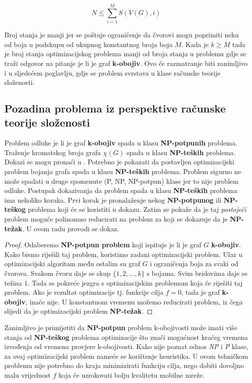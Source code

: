 \documentclass[times, utf8, diplomski, numeric]{fer}
\begin{document}
\begin{equation}
N \le \sum_{i=1}^{M} S(V(G), i)
\end{equation}

Broj stanja je manji jer se poštuje ograničenje da čvorovi mogu poprimiti neku od boja u podskupu od ukupnog konstantnog broja boja $M$. Kada je $k\ge M$ tada je broj stanja optimizacijskog problema manji od broja stanja u problemu gdje se traži odgovor na pitanje je li je graf \textbf{k-obojiv}. Ovo će razmatranje biti zanimljivo i u sljedećem poglavlju, gdje se problem svrstava u klase računske teorije složenosti.

\subsection{Pozadina problema iz perspektive računske teorije složenosti}

Problem odluke je li je graf \textbf{k-obojiv} spada u klasu \textbf{NP-potpunih} problema. Traženje kromatskog broja grafa $\chi(G)$ spada u klasu \textbf{NP-teških} problema. Dokazi se mogu pronaći u \cite{lit16}. Potrebno je pokazati da postavljen optimizacijski problem bojanja grafa spada u klasu \textbf{NP-teških} problema. Problem sigurno ne može spadati u druge spomenute (P, NP, NP-potpun) klase jer to nije problem odluke.
Postupak dokazivanja da problem spada u klasu \textbf{NP-teških} problema ima nekoliko koraka. Prvi korak je pronalaženje nekog \textbf{NP-potpunog} ili \textbf{NP-teškog} problema koji će se koristiti u dokazu. Zatim se pokaže da je taj \emph{postojeći} problem moguće polinomno reducirati na problem za koji se dokazuje da je \textbf{NP-težak}. U ovom radu provodi se dokaz. 

\begin{proof}
Odaberemo \textbf{NP-potpun problem} koji ispituje je li je graf $G$ \textbf{k-obojiv}. Kako bismo riješili taj problem, koristimo zadani optimizacijski problem. Ulaz u optimizacijski algoritam među ostalim su graf $G$ i ograničenja boja za svaki od čvorova. Svakom čvoru daje se skup $\{1,2,...,k\}$ s bojama. Svim bridovima daje se težina $1$. Tada se pokreće jezgra s optimizacijskim problemom koja će riješiti taj problem. Ako je rezultat optimizacije tj. funkcije cilja $f=0$, tada je graf \textbf{k-obojiv}, inače nije. U konstantnom vremenu možemo reducirati problem, iz čega slijedi da je optimizacijski problem \textbf{NP-težak}.  
\end{proof}

Zanimljivo je primijetiti da \textbf{NP-potpun} problem k-obojivosti može imati više stanja od \textbf{NP-teškog} problema optimizacije što znači mogućnost kraćeg vremena izvođenja od vremena provjere k-obojivosti. Kako nije poznat odnos \emph{NP} i \emph{P} klase, za ovaj optimizacijski problem nameće se korištenje heuristika. U ovom tehničkom problemu nije potrebno do kraja minimizirati funkciju cilja, nego dobiti dovoljno malu vrijednost $f$ koja će uzrokovati bolju kvalitetu mobilne mreže. 
\end{document}
